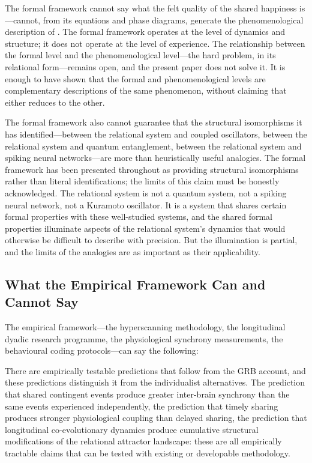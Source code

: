 The formal framework cannot say what the felt quality of the shared happiness is---cannot, from its equations and phase diagrams, generate the phenomenological description of . The formal framework operates at the level of dynamics and structure; it does not operate at the level of experience. The relationship between the formal level and the phenomenological level---the hard problem, in its relational form---remains open, and the present paper does not solve it. It is enough to have shown that the formal and phenomenological levels are complementary descriptions of the same phenomenon, without claiming that either reduces to the other.

The formal framework also cannot guarantee that the structural isomorphisms it has identified---between the relational system and coupled oscillators, between the relational system and quantum entanglement, between the relational system and spiking neural networks---are more than heuristically useful analogies. The formal framework has been presented throughout as providing structural isomorphisms rather than literal identifications; the limits of this claim must be honestly acknowledged. The relational system is not a quantum system, not a spiking neural network, not a Kuramoto oscillator. It is a system that shares certain formal properties with these well-studied systems, and the shared formal properties illuminate aspects of the relational system's dynamics that would otherwise be difficult to describe with precision. But the illumination is partial, and the limits of the analogies are as important as their applicability.

\subsection{What the Empirical Framework Can and Cannot Say}
\label{p14:subsec:conc_empirical}

\noindent
The empirical framework---the hyperscanning methodology, the longitudinal dyadic research programme, the physiological synchrony measurements, the behavioural coding protocols---can say the following:

There are empirically testable predictions that follow from the GRB account, and these predictions distinguish it from the individualist alternatives. The prediction that shared contingent events produce greater inter-brain synchrony than the same events experienced independently, the prediction that timely sharing produces stronger physiological coupling than delayed sharing, the prediction that longitudinal co-evolutionary dynamics produce cumulative structural modifications of the relational attractor landscape: these are all empirically tractable claims that can be tested with existing or developable methodology.

